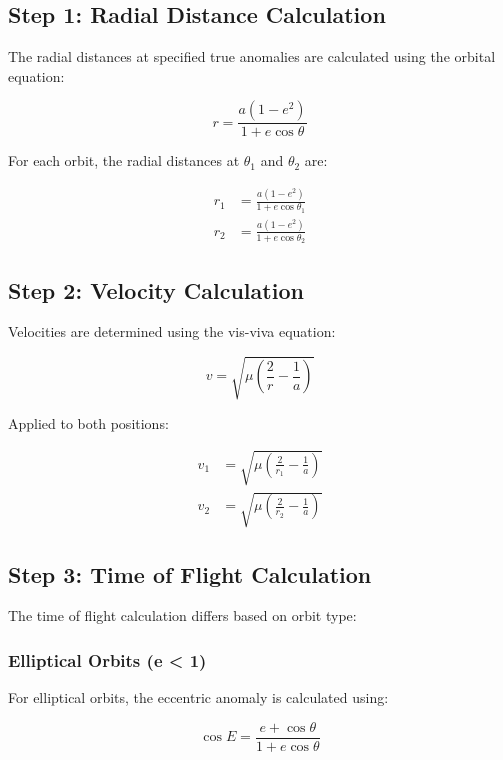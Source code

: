 \documentclass[12pt,a4paper]{article}
\begin{document}
\subsection{Step 1: Radial Distance Calculation}

The radial distances at specified true anomalies are calculated using the orbital equation:

\begin{equation}
r = \frac{a(1-e^2)}{1+e\cos\theta}
\end{equation}

For each orbit, the radial distances at $\theta_1$ and $\theta_2$ are:

\begin{align}
r_1 &= \frac{a(1-e^2)}{1+e\cos\theta_1} \\
r_2 &= \frac{a(1-e^2)}{1+e\cos\theta_2}
\end{align}

\subsection{Step 2: Velocity Calculation}

Velocities are determined using the vis-viva equation:

\begin{equation}
v = \sqrt{\mu\left(\frac{2}{r} - \frac{1}{a}\right)}
\end{equation}

Applied to both positions:

\begin{align}
v_1 &= \sqrt{\mu\left(\frac{2}{r_1} - \frac{1}{a}\right)} \\
v_2 &= \sqrt{\mu\left(\frac{2}{r_2} - \frac{1}{a}\right)}
\end{align}

\subsection{Step 3: Time of Flight Calculation}

The time of flight calculation differs based on orbit type:

\subsubsection{Elliptical Orbits (e < 1)}

For elliptical orbits, the eccentric anomaly is calculated using:

\begin{equation}
\cos E = \frac{e + \cos\theta}{1 + e\cos\theta}
\end{equation}
\end{document}
